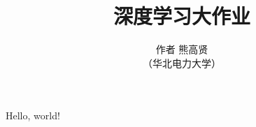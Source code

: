 \documentclass[UTF8,a4paper,10pt]{article}
\title{\textbf{\huge{深度学习大作业}}}
\author{作者 熊高贤\\
（华北电力大学）}
\date{}  %
\begin{document}
Hello, world!

\label{LastPage}
\end{document}
